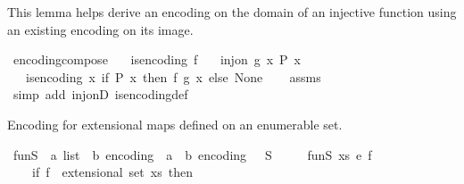 \begin{isabellebody}
\endisatagproof
{\isafoldproof}%
%
\isadelimproof
%
\endisadelimproof
%
\begin{isamarkuptext}%
This lemma helps derive an encoding on the domain of an injective function using an 
existing encoding on its image.%
\end{isamarkuptext}\isamarkuptrue%
\isamarkupfalse%
\ encoding{\isacharunderscore}{\kern0pt}compose{\isacharcolon}{\kern0pt}\isanewline
\ \ \ {\isachardoublequoteopen}is{\isacharunderscore}{\kern0pt}encoding\ f{\isachardoublequoteclose}\isanewline
\ \ \ {\isachardoublequoteopen}inj{\isacharunderscore}{\kern0pt}on\ g\ {\isacharbraceleft}{\kern0pt}x{\isachardot}{\kern0pt}\ P\ x{\isacharbraceright}{\kern0pt}{\isachardoublequoteclose}\isanewline
\ \ \ {\isachardoublequoteopen}is{\isacharunderscore}{\kern0pt}encoding\ {\isacharparenleft}{\kern0pt}{\isasymlambda}x{\isachardot}{\kern0pt}\ if\ P\ x\ then\ f\ {\isacharparenleft}{\kern0pt}g\ x{\isacharparenright}{\kern0pt}\ else\ None{\isacharparenright}{\kern0pt}{\isachardoublequoteclose}\isanewline
%
\isadelimproof
\ \ %
\endisadelimproof
%
\isatagproof
{}\isamarkupfalse%
\ assms\ \isamarkupfalse%
\ {\isacharparenleft}{\kern0pt}simp\ add{\isacharcolon}{\kern0pt}\ inj{\isacharunderscore}{\kern0pt}onD\ is{\isacharunderscore}{\kern0pt}encoding{\isacharunderscore}{\kern0pt}def{\isacharparenright}{\kern0pt}%
\endisatagproof
{\isafoldproof}%
%
\isadelimproof
%
\endisadelimproof
%
\begin{isamarkuptext}%
Encoding for extensional maps defined on an enumerable set.%
\end{isamarkuptext}\isamarkuptrue%
\isamarkupfalse%
\ fun\isactrlsub S\ {\isacharcolon}{\kern0pt}{\isacharcolon}{\kern0pt}\ {\isachardoublequoteopen}{\isacharprime}{\kern0pt}a\ list\ {\isasymRightarrow}\ {\isacharprime}{\kern0pt}b\ encoding\ {\isasymRightarrow}\ {\isacharparenleft}{\kern0pt}{\isacharprime}{\kern0pt}a\ {\isasymRightarrow}\ {\isacharprime}{\kern0pt}b{\isacharparenright}{\kern0pt}\ encoding{\isachardoublequoteclose}\ \ {\isacharparenleft}{\kern0pt}\ {\isachardoublequoteopen}{\isasymrightarrow}\isactrlsub S{\isachardoublequoteclose}\ {}{}{\isacharparenright}{\kern0pt}\ \ \isanewline
\ \ {\isachardoublequoteopen}fun\isactrlsub S\ xs\ e\ f\ {\isacharequal}{\kern0pt}\ {\isacharparenleft}{\kern0pt}\isanewline
\ \ \ \ if\ f\ {\isasymin}\ extensional\ {\isacharparenleft}{\kern0pt}set\ xs{\isacharparenright}{\kern0pt}\ then\ \isanewline

\end{isabellebody}

